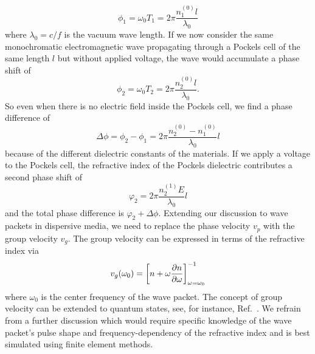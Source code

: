 \begin{equation*}
	\phi_1
	=
	\omega_0T_1
	=
	2\pi\frac{n_1^{(0)}l}{\lambda_0}
\end{equation*}
where $\lambda_0=c/f$ is the vacuum wave length.
If we now consider the same monochromatic electromagnetic wave propagating through a Pockels cell of the same length $l$ but without applied voltage, the wave would accumulate a phase shift of
\begin{equation}
	\phi_2
	=
	\omega_0T_2
	=
	2\pi\frac{n_2^{(0)}l}{\lambda_0}
	.
\end{equation}
So even when there is no electric field inside the Pockels cell, we find a phase difference of
\begin{equation}
	\Delta\phi
	=
	\phi_2
	-
	\phi_1
	=
	2\pi\frac{n_2^{(0)}-n_1^{(0)}}{\lambda_0}l
\end{equation}
because of the different dielectric constants of the materials.
If we apply a voltage to the Pockels cell, the refractive index of the Pockels dielectric contributes a second phase shift of
\begin{equation}
	\varphi_2
	=
	2\pi\frac{n_2^{(1)}E}{\lambda_0}l
\end{equation}
and the total phase difference is $\varphi_2+\Delta\phi$.
Extending our discussion to wave packets in dispersive media, we need to replace the phase velocity $v_p$ with the group velocity $v_g$.
The group velocity can be expressed in terms of the refractive index via~\cite[p.~211]{Jackson2007}
\begin{equation}
	v_g(\omega_0)
	=
	\left[
		n
		+
		\omega
		\pdv{n}{\omega}
	\right]^{-1}_{\omega=\omega_0}
\end{equation}
where $\omega_0$ is the center frequency of the wave packet.
The concept of group velocity can be extended to quantum states, see, for instance, Ref.~\cite[p.~3]{Naumov2013}.
We refrain from a further discussion which would require specific knowledge of the wave packet's pulse shape and frequency-dependency of the refractive index and is best simulated using finite element methods.

